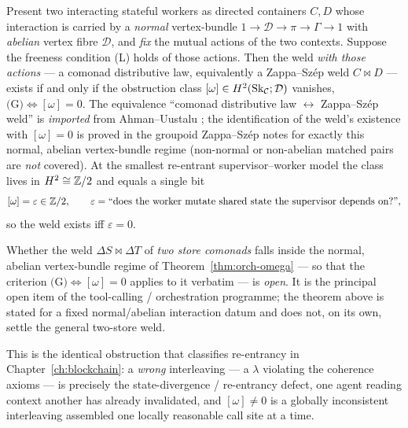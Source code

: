 \begin{theorem}
\label{thm:orch-omega}
Present two interacting stateful workers as directed containers $C,D$ whose
interaction is carried by a \emph{normal} vertex-bundle
$1\to\mathcal D\to\pi\to\Gamma\to1$ with \emph{abelian} vertex fibre $\mathcal D$,
and \emph{fix} the mutual actions of the two contexts. Suppose the freeness
condition \textup{(L)} holds of those actions. Then the weld \emph{with those
actions} --- a comonad distributive law, equivalently a Zappa--Sz\'ep weld
$C\bowtie D$ --- exists if and only if the obstruction class
$[\omega]\in H^2(\mathrm{Sk}_{\mathcal C};\mathcal D)$ vanishes,
$\text{(G)}\Leftrightarrow[\omega]=0$. The equivalence ``comonad distributive law
$\leftrightarrow$ Zappa--Sz\'ep weld'' is \emph{imported} from Ahman--Uustalu
\cite{AhmanUustaluDL}; the identification of the weld's existence with $[\omega]=0$
is proved in the groupoid Zappa--Sz\'ep notes \cite{macbeth-reduction,cl-emergent}
for exactly this normal, abelian vertex-bundle regime (non-normal or non-abelian
matched pairs are \emph{not} covered). At the smallest re-entrant supervisor--worker
model the class lives in $H^2\cong\mathbb{Z}/2$ and equals a single bit
\begin{equation}\label{eq:orch-bit}
  [\omega]=\varepsilon\in\mathbb{Z}/2,
  \qquad
  \varepsilon=\text{``does the worker mutate shared state the supervisor depends on?''},
\end{equation}
so the weld exists iff $\varepsilon=0$.
\end{theorem}

\begin{remark}\label{rem:orch-twostore}
Whether the weld $\Delta S\bowtie\Delta T$ of \emph{two store comonads} falls inside
the normal, abelian vertex-bundle regime of Theorem~\ref{thm:orch-omega} --- so that
the criterion $\text{(G)}\Leftrightarrow[\omega]=0$ applies to it verbatim --- is
\emph{open}. It is the principal open item of the tool-calling / orchestration
programme; the theorem above is stated for a fixed normal/abelian interaction datum
and does not, on its own, settle the general two-store weld.
\end{remark}

This is the identical obstruction that classifies re-entrancy in Chapter~\ref{ch:blockchain}: a
\emph{wrong} interleaving --- a $\lambda$ violating the coherence axioms --- is precisely the
state-divergence / re-entrancy defect, one agent reading context another has already invalidated,
and $[\omega]\ne0$ is a globally inconsistent interleaving assembled one locally reasonable call site
at a time.

